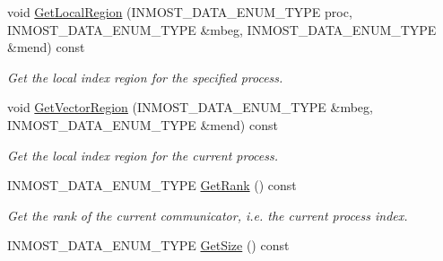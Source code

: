 \begin{DoxyCompactItemize}
\item 
\hypertarget{classINMOST_1_1Solver_1_1OrderInfo_a22fe66e8bb6198d67bdd7e97eee4fe23}{void \hyperlink{classINMOST_1_1Solver_1_1OrderInfo_a22fe66e8bb6198d67bdd7e97eee4fe23}{Get\-Local\-Region} (I\-N\-M\-O\-S\-T\-\_\-\-D\-A\-T\-A\-\_\-\-E\-N\-U\-M\-\_\-\-T\-Y\-P\-E proc, I\-N\-M\-O\-S\-T\-\_\-\-D\-A\-T\-A\-\_\-\-E\-N\-U\-M\-\_\-\-T\-Y\-P\-E \&mbeg, I\-N\-M\-O\-S\-T\-\_\-\-D\-A\-T\-A\-\_\-\-E\-N\-U\-M\-\_\-\-T\-Y\-P\-E \&mend) const }\label{classINMOST_1_1Solver_1_1OrderInfo_a22fe66e8bb6198d67bdd7e97eee4fe23}

\begin{DoxyCompactList}\small\item\em Get the local index region for the specified process. \end{DoxyCompactList}\item 
\hypertarget{classINMOST_1_1Solver_1_1OrderInfo_a03437ef8f15cef652ada3a6c401bdfcd}{void \hyperlink{classINMOST_1_1Solver_1_1OrderInfo_a03437ef8f15cef652ada3a6c401bdfcd}{Get\-Vector\-Region} (I\-N\-M\-O\-S\-T\-\_\-\-D\-A\-T\-A\-\_\-\-E\-N\-U\-M\-\_\-\-T\-Y\-P\-E \&mbeg, I\-N\-M\-O\-S\-T\-\_\-\-D\-A\-T\-A\-\_\-\-E\-N\-U\-M\-\_\-\-T\-Y\-P\-E \&mend) const }\label{classINMOST_1_1Solver_1_1OrderInfo_a03437ef8f15cef652ada3a6c401bdfcd}

\begin{DoxyCompactList}\small\item\em Get the local index region for the current process. \end{DoxyCompactList}\item 
\hypertarget{classINMOST_1_1Solver_1_1OrderInfo_a63c69e2e7e85de999627eb12a547a0c6}{I\-N\-M\-O\-S\-T\-\_\-\-D\-A\-T\-A\-\_\-\-E\-N\-U\-M\-\_\-\-T\-Y\-P\-E \hyperlink{classINMOST_1_1Solver_1_1OrderInfo_a63c69e2e7e85de999627eb12a547a0c6}{Get\-Rank} () const }\label{classINMOST_1_1Solver_1_1OrderInfo_a63c69e2e7e85de999627eb12a547a0c6}

\begin{DoxyCompactList}\small\item\em Get the rank of the current communicator, i.\-e. the current process index. \end{DoxyCompactList}\item 
\hypertarget{classINMOST_1_1Solver_1_1OrderInfo_abb1a4ca671c5d5e731926c300d597825}{I\-N\-M\-O\-S\-T\-\_\-\-D\-A\-T\-A\-\_\-\-E\-N\-U\-M\-\_\-\-T\-Y\-P\-E \hyperlink{classINMOST_1_1Solver_1_1OrderInfo_abb1a4ca671c5d5e731926c300d597825}{Get\-Size} () const }\label{classINMOST_1_1Solver_1_1OrderInfo_abb1a4ca671c5d5e731926c300d597825}


\end{DoxyCompactItemize}
